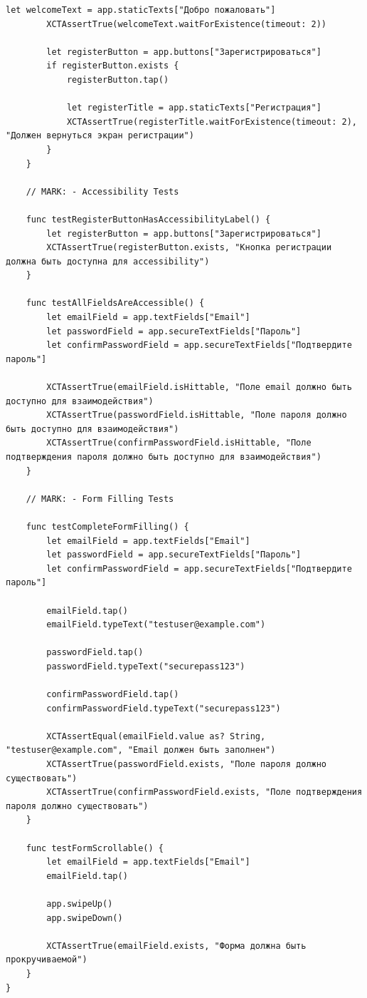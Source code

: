 \begin{lstlisting}[basicstyle=\tiny\ttfamily,breaklines=true]
        let welcomeText = app.staticTexts["Добро пожаловать"]
        XCTAssertTrue(welcomeText.waitForExistence(timeout: 2))

        let registerButton = app.buttons["Зарегистрироваться"]
        if registerButton.exists {
            registerButton.tap()

            let registerTitle = app.staticTexts["Регистрация"]
            XCTAssertTrue(registerTitle.waitForExistence(timeout: 2), "Должен вернуться экран регистрации")
        }
    }

    // MARK: - Accessibility Tests

    func testRegisterButtonHasAccessibilityLabel() {
        let registerButton = app.buttons["Зарегистрироваться"]
        XCTAssertTrue(registerButton.exists, "Кнопка регистрации должна быть доступна для accessibility")
    }

    func testAllFieldsAreAccessible() {
        let emailField = app.textFields["Email"]
        let passwordField = app.secureTextFields["Пароль"]
        let confirmPasswordField = app.secureTextFields["Подтвердите пароль"]

        XCTAssertTrue(emailField.isHittable, "Поле email должно быть доступно для взаимодействия")
        XCTAssertTrue(passwordField.isHittable, "Поле пароля должно быть доступно для взаимодействия")
        XCTAssertTrue(confirmPasswordField.isHittable, "Поле подтверждения пароля должно быть доступно для взаимодействия")
    }

    // MARK: - Form Filling Tests

    func testCompleteFormFilling() {
        let emailField = app.textFields["Email"]
        let passwordField = app.secureTextFields["Пароль"]
        let confirmPasswordField = app.secureTextFields["Подтвердите пароль"]

        emailField.tap()
        emailField.typeText("testuser@example.com")

        passwordField.tap()
        passwordField.typeText("securepass123")

        confirmPasswordField.tap()
        confirmPasswordField.typeText("securepass123")

        XCTAssertEqual(emailField.value as? String, "testuser@example.com", "Email должен быть заполнен")
        XCTAssertTrue(passwordField.exists, "Поле пароля должно существовать")
        XCTAssertTrue(confirmPasswordField.exists, "Поле подтверждения пароля должно существовать")
    }

    func testFormScrollable() {
        let emailField = app.textFields["Email"]
        emailField.tap()

        app.swipeUp()
        app.swipeDown()

        XCTAssertTrue(emailField.exists, "Форма должна быть прокручиваемой")
    }
}
\end{lstlisting}
